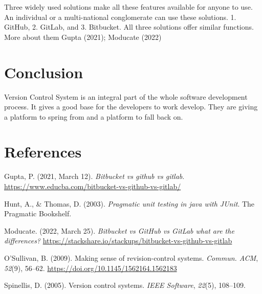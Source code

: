 \documentclass[
  man]{apa7}
\newlength{\cslhangindent}
\newlength{\cslentryspacingunit} %
\newenvironment{CSLReferences}[2] %
 {%
  \setlength{\parindent}{0pt}
  \ifodd #1
  \let\oldpar\par
  \def\par{\hangindent=\cslhangindent\oldpar}
  \fi
  \setlength{\parskip}{#2\cslentryspacingunit}
 }%
 {}
\begin{document}
Three widely used solutions make all these features available for anyone to use. An individual or a multi-national conglomerate can use these solutions. 1. GitHub, 2. GitLab, and 3. Bitbucket. All three solutions offer similar functions. More about them Gupta (2021); Moducate (2022)

\hypertarget{conclusion}{%
\section{Conclusion}\label{conclusion}}

Version Control System is an integral part of the whole software development process. It gives a good base for the developers to work develop. They are giving a platform to spring from and a platform to fall back on.

\newpage

\hypertarget{references}{%
\section{References}\label{references}}

\hypertarget{refs}{}
\begin{CSLReferences}{1}{0}
\leavevmode{}%
Gupta, P. (2021, March 12). \emph{Bitbucket vs github vs gitlab}. \url{https://www.educba.com/bitbucket-vs-github-vs-gitlab/}

\leavevmode{}%
Hunt, A., \& Thomas, D. (2003). \emph{Pragmatic unit testing in java with JUnit}. The Pragmatic Bookshelf.

\leavevmode{}%
Moducate. (2022, March 25). \emph{Bitbucket vs GitHub vs GitLab \textbar{} what are the differences?} \url{https://stackshare.io/stackups/bitbucket-vs-github-vs-gitlab}

\leavevmode{}%
O'Sullivan, B. (2009). Making sense of revision-control systems. \emph{Commun. ACM}, \emph{52}(9), 56--62. \url{https://doi.org/10.1145/1562164.1562183}

\leavevmode{}%
Spinellis, D. (2005). Version control systems. \emph{IEEE Software}, \emph{22}(5), 108--109.

\end{CSLReferences}


\clearpage
\renewcommand{\listfigurename}{Figure captions}
\end{document}
